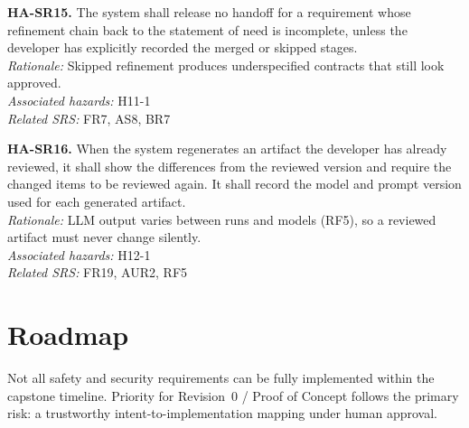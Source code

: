 \documentclass{article}
\begin{document}
\medskip
\noindent\textbf{HA-SR15.} The system shall release no handoff for a requirement
whose refinement chain back to the statement of need is incomplete, unless the
developer has explicitly recorded the merged or skipped stages.\\
\textit{Rationale:} Skipped refinement produces underspecified contracts that
still look approved.\\
\textit{Associated hazards:} H11-1\\
\textit{Related SRS:} FR7, AS8, BR7

\medskip
\noindent\textbf{HA-SR16.} When the system regenerates an artifact the developer
has already reviewed, it shall show the differences from the reviewed version
and require the changed items to be reviewed again. It shall record the model
and prompt version used for each generated artifact.\\
\textit{Rationale:} LLM output varies between runs and models (RF5), so a
reviewed artifact must never change silently.\\
\textit{Associated hazards:} H12-1\\
\textit{Related SRS:} FR19, AUR2, RF5

\section{Roadmap}

Not all safety and security requirements can be fully implemented within the
capstone timeline. Priority for Revision~0 / Proof of Concept follows the
primary risk: a trustworthy intent-to-implementation mapping under human
approval.
\end{document}

